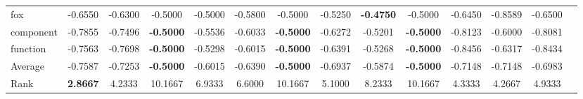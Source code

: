 \begin{threeparttable}
\begin{tabular}{lccccccccccccc}
fox &-0.6550 &-0.6300 &-0.5000 &-0.5000 &-0.5800 &-0.5000 &-0.5250 &\textbf{-0.4750} &-0.5000 &-0.6450 &-0.8589 &-0.6500 &  \\
component &-0.7855 &-0.7496 &\textbf{-0.5000} &-0.5536 &-0.6033 &\textbf{-0.5000} &-0.6272 &-0.5201 &\textbf{-0.5000} &-0.8123 &-0.6000 &-0.8081 &  \\
function &-0.7563 &-0.7698 &\textbf{-0.5000} &-0.5298 &-0.6015 &\textbf{-0.5000} &-0.6391 &-0.5268 &\textbf{-0.5000} &-0.8456 &-0.6317 &-0.8434 &  \\
\hline
Average &-0.7587 &-0.7253 &\textbf{-0.5000} &-0.6015 &-0.6390 &\textbf{-0.5000} &-0.6937 &-0.5874 &\textbf{-0.5000} &-0.7148 &-0.7148 &-0.6983 &  \\
Rank &\textbf{2.8667} &4.2333 &10.1667 &6.9333 &6.6000 &10.1667 &5.1000 &8.2333 &10.1667 &4.3333 &4.2667 &4.9333 &  \\
\bottomrule
\end{tabular}
\end{threeparttable}